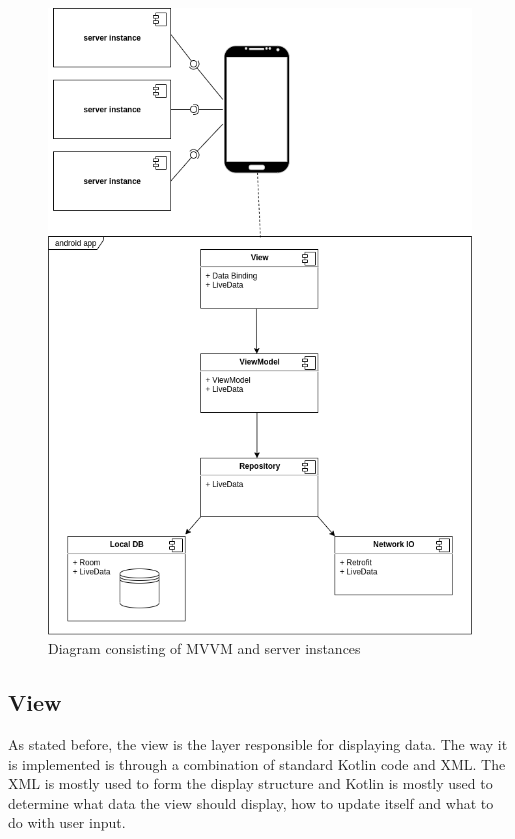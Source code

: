\begin{figure}\centering
	\includegraphics[width=1\textwidth]{pics/bc-architecture.png}
	\caption[Architecture]{Diagram consisting of MVVM and server instances}\label{fig:architecture}
\end{figure}

\subsection{View}
As stated before, the view is the layer responsible for displaying data.
The way it is implemented is through a combination of standard Kotlin code and XML.
The XML is mostly used to form the display structure and Kotlin is mostly used to determine what data the view should display, how to update itself and what to do with user input.

